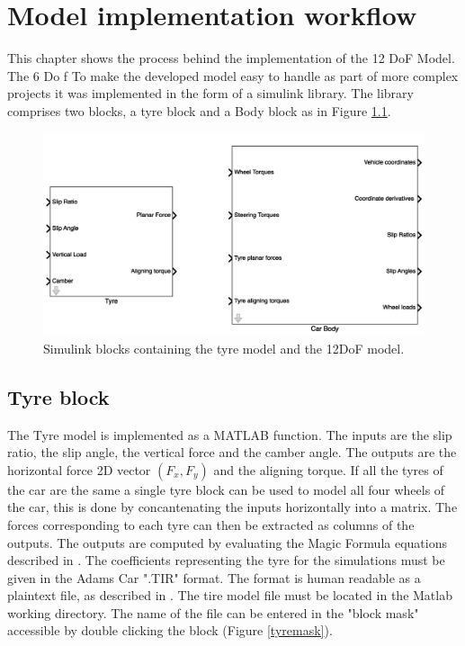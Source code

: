 \chapter{Model implementation workflow}
\label{chap:workflow}
This chapter shows the process behind the implementation of the 12 DoF Model. The 6 Do f
To make the developed model easy to handle as part of more complex projects it was implemented in the form of a simulink library.
The library comprises two blocks, a tyre block and a Body block as in Figure \ref{blocks}.
\begin{figure}[ht]
  \centering
  \includegraphics[scale=0.5]{images/bodyblockmask.png}
  \caption{Simulink blocks containing the tyre model and the 12DoF model.}
  \label{blocks}
\end{figure}

\section{Tyre block}

The Tyre model is implemented as a MATLAB function. The inputs are the slip ratio, the slip angle, the vertical force and the camber angle. The outputs are the horizontal force 2D vector $(F_x, F_y)$ and the aligning torque.
If all the tyres of the car are the same a single tyre block can be used to model all four wheels of the car, this is done by concantenating the inputs horizontally into a matrix. The forces corresponding to each tyre can then be extracted as columns of the outputs.
The outputs are computed by evaluating the Magic Formula equations described in .
The coefficients representing the tyre for the simulations must be given in the Adams Car ".TIR" format. The format is human readable as a plaintext file, as described in .
The tire model file must be located in the Matlab working directory. The name of the file can be entered in the "block mask" accessible by double clicking the block (Figure \ref{tyremask}).

